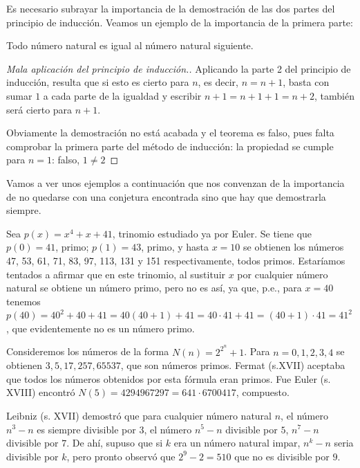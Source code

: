 		 
		Es necesario subrayar la importancia de la demostración de las dos partes del principio de inducción. Veamos un ejemplo de la importancia de la primera parte:
		
		\begin{ejem}
			Todo número natural es igual al número natural siguiente.
		\end{ejem}
		
		\begin{proof}[Mala aplicación del principio de inducción.]
			
		Aplicando la parte 2 del principio de inducción, resulta que si esto es cierto para $n$, es decir, $n=n+1$, basta con sumar $1$ a cada parte de la igualdad y escribir $n+1=n+1+1=n+2$, también será cierto para $n+1$.
		
		Obviamente la demostración no está acabada y el teorema es falso, pues falta comprobar la primera parte del método de inducción: la propiedad se cumple para $n=1$: falso, $1\neq 2$ %
		\end{proof}
		
		Vamos a ver unos ejemplos a continuación que nos convenzan de la importancia de no quedarse con una conjetura encontrada sino que hay que demostrarla siempre.
		
		\begin{ejem}
			Sea $p(x)=x^4+x+41$, trinomio estudiado ya por Euler. Se tiene que $p(0)=41$, primo; $p(1)=43$, primo, y hasta $x=10$ se obtienen los números 47, 53, 61, 71, 83, 97, 113, 131 y 151 respectivamente, todos primos. Estaríamos tentados a afirmar que en este trinomio, al sustituir $x$ por cualquier número natural se obtiene un número primo, pero no es así, ya que, p.e., para $x=40$ tenemos $p(40)=40^2+40+41=40(40+1)+41=40\cdot 41+41=(40+1)\cdot 41=41^2$, que evidentemente no es un número primo.
		\end{ejem}
		
		 \begin{ejem} Consideremos los números de la forma $N(n)=2^{2^n}+1$. Para $n=0,1,2,3,4$ se obtienen $3, 5, 17, 257, 65537$, que son números primos. Fermat (s.XVII) aceptaba que todos los números obtenidos por esta fórmula eran primos. Fue Euler (s. XVIII) encontró $N(5)=4294967297=641\cdot 6700417$, compuesto.
		\end{ejem}
		
		\begin{ejem}
 			Leibniz (s. XVII) demostró que para cualquier número natural $n$, el número $n^3-n$ es siempre divisible por $3$, el número $n^5-n$ divisible por $5$, $n^7-n$ divisible por $7$. De ahí, supuso que si $k$ era un número natural impar, $n^k-n$ seria divisible por $k$, pero pronto observó que $2^9-2=510$ que no es divisible por $9$.
 		\end{ejem}
 		
